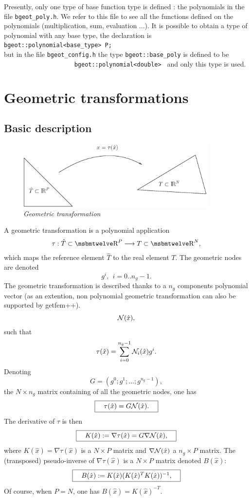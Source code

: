 \documentclass[11pt,a4paper]{article}
\begin{document}
Presently, only one type of base function type is defined : the polynomials in the file {\tt bgeot\_poly.h}. We refer to this file to see all the functions defined on the polynomials (multiplication, sum, evaluation ...). It is possible to obtain a type of polynomial with any base type, the declaration is\\[0.5cm]
{\tt bgeot::polynomial<base\_type> P;}\\[0.5cm]
but in the file  {\tt bgeot\_config.h} the type  {\tt bgeot::base\_poly} is defined to be $\hspace{10em}$ {\tt bgeot::polynomial<double> } and only this type is used.

\section{Geometric transformations}
\subsection{Basic description}
\begin{figure}[htb]
  \begin{center}
    \includegraphics[width=10cm,angle=0]{getfemelem_trans.eps}
  \end{center}
  \caption{ \it Geometric transformation }
  \label{fig:transgeo}
\end{figure}

A geometric transformation is a polynomial application
$$ \tau : \hat{T} \subset \Reel^P \longrightarrow T \subset\Reel^N, $$
which maps the reference element $\hat{T}$ to the real element $T$.
The geometric nodes are denoted
$$ g^i, \ \ i = 0 .. n_g - 1. $$
The geometric transformation is described thanks to a $n_g$ components polynomial vector (as an extention, non polynomial geometric transformation can also be supported by getfem++).
$$ {\cal N}(\hat{x}), $$
such that
$$ \tau(\hat{x}) = \sum_{i = 0}^{n_g - 1} {\cal N}_i(\hat{x}) g^i.$$
Denoting
$$ G = (g^0; g^1; ...; g^{n_g - 1}), $$
the $N \times n_g$ matrix containing of all the geometric nodes, one has
$$ \fbox{$\hspace{1em}\tau(\hat{x}) = G {\cal N}(\hat{x}).\hspace{1em}$} $$
The derivative of $\tau$ is then
$$ \fbox{$\hspace{1em} K(\hat{x}) := \nabla \tau(\hat{x}) = G \nabla {\cal N}(\hat{x}),\hspace{1em}$} $$
where $K(\hat{x}) = \nabla \tau(\hat{x})$ is a $N \times P$ matrix and $\nabla {\cal N}(\hat{x})$ a $n_g \times P$ matrix.
The (transposed) pseudo-inverse of $\nabla\tau(\hat{x})$ is a $N\times P$ matrix denoted $B(\hat{x})$:
$$ \fbox{$\hspace{1em} B(\hat{x}) := K(\hat{x})(K(\hat{x})^T K(\hat{x}))^{-1},\hspace{1em}$} $$
Of course, when $P=N$, one has $B(\hat{x})=K(\hat{x})^{-T}$.
\end{document}

